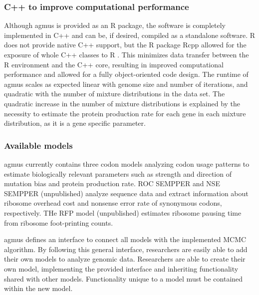 \documentclass{bioinfo}
\newcommand{\package}{agmus } %
\begin{document}
\subsubsection*{C++ to improve computational performance}
Although \package is provided as an R package, the software is completely implemented in C++ and can be, if desired, compiled as a standalone software.
R does not provide native C++ support, but the R package Rcpp allowed for the exposure of whole C++ classes to R  \citep{rcpp_package}.
This minimizes data transfer between the R environment and the C++ core, resulting in improved computational performance and allowed for a fully object-oriented code design. 
The runtime of \package scales as expected linear with genome size and number of iterations, and quadratic with the number of mixture distributions in the data set. The quadratic increase in the number of mixture distributions is explained by the necessity to estimate the protein production rate for each gene in each mixture distribution, as it is a gene specific parameter.  

\subsubsection*{Available models}
\package currently contains three codon models analyzing codon usage patterns to estimate biologically relevant parameters such as strength and direction of mutation bias and protein production rate. 
ROC SEMPPER \citep{gilchrist2015} and NSE SEMPPER (unpublished) analyze sequence data and extract information about ribosome overhead cost and nonsense error rate of synonymous codons, respectively. 
THe RFP model (unpublished) estimates ribosome pausing time from ribosome foot-printing counts.


\package defines an interface to connect all models with the implemented MCMC algorithm. 
By following this general interface, researchers are easily able to add their own models to analyze genomic data.
Researchers are able to create their own model, implementing the provided interface and inheriting functionality shared with other models.
Functionality unique to a model must be contained within the new model. 



\end{document}
